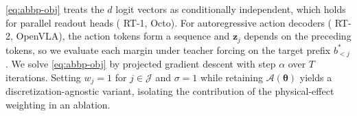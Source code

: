 \autoref{eq:abbp-obj} treats the $d$ logit vectors as conditionally independent, which holds for parallel readout heads ({\eg} RT-1, Octo). For autoregressive action decoders ({\eg} RT-2, OpenVLA), the action tokens form a sequence and $\bm{z}_j$ depends on the preceding tokens, so we evaluate each margin under teacher forcing on the target prefix $b^{*}_{<j}$. We solve \autoref{eq:abbp-obj} by projected gradient descent with step $\alpha$ over $T$ iterations. Setting $w_j{=}1$ for $j\in\mathcal{J}$ and $\sigma{=}1$ while retaining $\mathcal{A}(\bm{\theta})$ yields a discretization-agnostic variant, isolating the contribution of the physical-effect weighting in an ablation.


